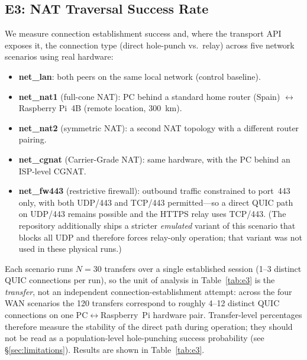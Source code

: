﻿\documentclass[journal]{IEEEtran}
\begin{document}
\subsection{E3: NAT Traversal Success Rate}
\label{sec:e3}

We measure connection establishment success and, where the transport API exposes it, the connection type (direct hole-punch vs.~relay) across five network scenarios using real hardware:

\begin{itemize}
    \item \textbf{net\_lan}: both peers on the same local network (control baseline).
    \item \textbf{net\_nat1} (full-cone NAT): PC behind a standard home router (Spain) $\leftrightarrow$ Raspberry Pi~4B (remote location, 300~km).
    \item \textbf{net\_nat2} (symmetric NAT): a second NAT topology with a different router pairing.
    \item \textbf{net\_cgnat} (Carrier-Grade NAT): same hardware, with the PC behind an ISP-level CGNAT.
    \item \textbf{net\_fw443} (restrictive firewall): outbound traffic constrained to port~443 only, with both UDP/443 and TCP/443 permitted---so a direct QUIC path on UDP/443 remains possible and the HTTPS relay uses TCP/443. (The repository additionally ships a stricter \emph{emulated} variant of this scenario that blocks all UDP and therefore forces relay-only operation; that variant was not used in these physical runs.)
\end{itemize}

Each scenario runs $N{=}30$ transfers over a single established session (1--3 distinct QUIC connections per run), so the unit of analysis in Table~\ref{tab:e3} is the \emph{transfer}, not an independent connection-establishment attempt: across the four WAN scenarios the 120 transfers correspond to roughly 4--12 distinct QUIC connections on one PC$\leftrightarrow$Raspberry~Pi hardware pair. Transfer-level percentages therefore measure the stability of the direct path during operation; they should not be read as a population-level hole-punching success probability (see \S\ref{sec:limitations}). Results are shown in Table~\ref{tab:e3}.
\end{document}
